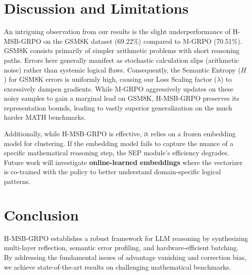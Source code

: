 \documentclass[letterpaper]{article}
\begin{document}
\section{Discussion and Limitations}
An intriguing observation from our results is the slight underperformance of H-MSB-GRPO on the GSM8K dataset (69.22\%) compared to M-GRPO (70.51\%). GSM8K consists primarily of simpler arithmetic problems with short reasoning paths. Errors here generally manifest as stochastic calculation slips (arithmetic noise) rather than systemic logical flaws. Consequently, the Semantic Entropy ($H$) for GSM8K errors is uniformly high, causing our Loss Scaling factor ($\lambda$) to excessively dampen gradients. While M-GRPO aggressively updates on these noisy samples to gain a marginal lead on GSM8K, H-MSB-GRPO preserves its representation bounds, leading to vastly superior generalization on the much harder MATH benchmarks.

Additionally, while H-MSB-GRPO is effective, it relies on a frozen embedding model for clustering. If the embedding model fails to capture the nuance of a specific mathematical reasoning step, the SEP module's efficiency degrades. Future work will investigate \textbf{online-learned embeddings} where the vectorizer is co-trained with the policy to better understand domain-specific logical patterns.

\section{Conclusion}
H-MSB-GRPO establishes a robust framework for LLM reasoning by synthesizing multi-layer reflection, semantic error profiling, and hardware-efficient batching. By addressing the fundamental issues of advantage vanishing and correction bias, we achieve state-of-the-art results on challenging mathematical benchmarks.



\end{document}
